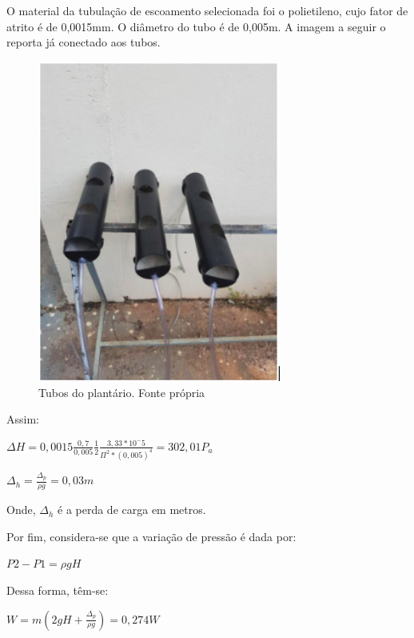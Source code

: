 O material da tubulação de escoamento selecionada foi o polietileno, cujo fator de atrito é de 0,0015mm. O diâmetro do tubo é de 0,005m. A imagem a seguir o reporta já conectado aos tubos. 

\begin{figure}[H]
	\centering
	\includegraphics[width=8cm]{figuras/tubos_plantario.png}
	\caption{Tubos do plantário. Fonte própria}
	\label{fatores_atrito}
\end{figure}

Assim:

\begin{center}
	\large
	${\displaystyle \Delta H = 0,0015 \frac{0,7}{0,005} \frac{1}{2} \frac{3,33*10^-5}{\Pi^2 * (0,005)^4}}=302,01P_a$
\end{center}

\begin{center}
	\large
	${\displaystyle \Delta_h = \frac{\Delta_p}{\rho g} =0,03m}$
\end{center}
	
Onde, $\Delta_h$ é a perda de carga em metros.

Por fim, considera-se que a variação de pressão é dada por:

\begin{center}
	\large
	${\displaystyle P2 - P1= \rho g H}$
\end{center}


Dessa forma, têm-se:

\begin{center}
	\large
	${\displaystyle W= m(2gH + \frac{\Delta_p}{\rho g})= 0,274W}$
\end{center}




